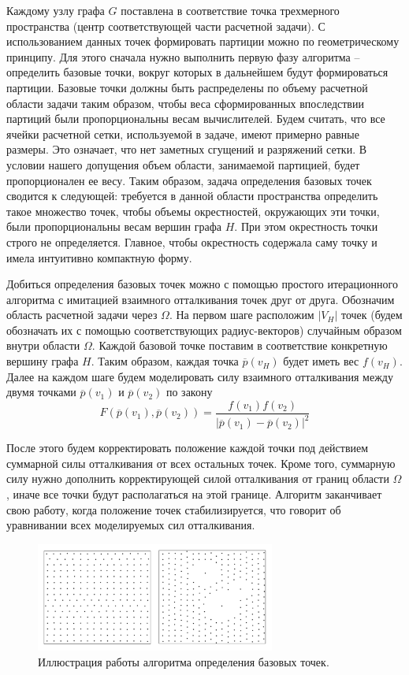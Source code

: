 Каждому узлу графа $G$ поставлена в соответствие точка трехмерного пространства (центр соответствующей части расчетной задачи). 
С использованием данных точек формировать партиции можно по геометрическому принципу.
Для этого сначала нужно выполнить первую фазу алгоритма -- определить базовые точки\label{term:distr_base_point}, вокруг которых в дальнейшем будут формироваться партиции.
Базовые точки должны быть распределены по объему расчетной области задачи таким образом, чтобы веса сформированных впоследствии партиций были пропорциональны весам вычислителей.
Будем считать, что все ячейки расчетной сетки, используемой в задаче, имеют примерно равные размеры.
Это означает, что нет заметных сгущений и разряжений сетки.
В условии нашего допущения объем области, занимаемой партицией, будет пропорционален ее весу.
Таким образом, задача определения базовых точек сводится к следующей: требуется в данной области пространства определить такое множество точек, чтобы объемы окрестностей, окружающих эти точки, были пропорциональны весам вершин графа $H$.
При этом окрестность точки строго не определяется.
Главное, чтобы окрестность содержала саму точку и имела интуитивно компактную форму.

Добиться определения базовых точек можно с помощью простого итерационного алгоритма с имитацией взаимного отталкивания точек друг от друга.
Обозначим область расчетной задачи через $\Omega$.
На первом шаге расположим $|V_H|$ точек (будем обозначать их с помощью соответствующих радиус-векторов) случайным образом внутри области $\Omega$.
Каждой базовой точке поставим в соответствие конкретную вершину графа $H$.
Таким образом, каждая точка $\overline{p}(v_H)$ будет иметь вес $f(v_H)$.
Далее на каждом шаге будем моделировать силу взаимного отталкивания между двумя точками $\overline{p}(v_1)$ и $\overline{p}(v_2)$ по закону
\begin{equation}
	F(\overline{p}(v_1), \overline{p}(v_2)) = \frac{f(v_1) f(v_2)}{|\overline{p}(v_1) - \overline{p}(v_2)|^2}
\end{equation}

После этого будем корректировать положение каждой точки под действием суммарной силы отталкивания от всех остальных точек.
Кроме того, суммарную силу нужно дополнить корректирующей силой отталкивания от границ области $\Omega$, иначе все точки будут располагаться на этой границе.
Алгоритм заканчивает свою работу, когда положение точек стабилизируется, что говорит об уравнивании всех моделируемых сил отталкивания.

\begin{figure}[ht]
\centering
\includegraphics[width=0.7\textwidth]{./pics/text_2_getero/rvp.pdf}
\singlespacing
{}\caption{Иллюстрация работы алгоритма определения базовых точек.}
\label{fig:text_2_getero_rvp}
\end{figure}

